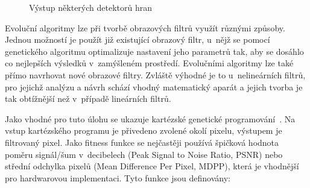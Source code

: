 \begin{figure}[htb]
    \centering
    \caption{Výstup některých detektorů hran}
    \label{obrDetektor}
\end{figure}



Evoluční algoritmy lze při tvorbě obrazových filtrů využít různými způsoby. Jednou možností je použít již existující obrazový filtr, u~nějž se pomocí genetického algoritmu optimalizuje nastavení jeho parametrů tak, aby se dosáhlo co nejlepších výsledků v~zamýšleném prostředí. Evolučními algoritmy lze také přímo navrhovat nové obrazové filtry. Zvláště výhodné je to u~nelineárních filtrů, pro jejichž analýzu a návrh schází vhodný matematický aparát a jejich tvorba je tak obtížnější než v~případě lineárních filtrů.

Jako vhodné pro tuto úlohu se ukazuje kartézské genetické programování~\cite{ZelenaIF}. Na vstup kartézského programu je přivedeno zvolené okolí pixelu, výstupem je filtrovaný pixel. Jako fitness funkce se nejčastěji používá špičková hodnota poměru signál/šum v~decibelech (Peak Signal to Noise Ratio, PSNR) nebo střední odchylka pixelů (Mean Difference Per Pixel, MDPP), která je vhodnější pro hardwarovou implementaci. Tyto funkce jsou definovány:

